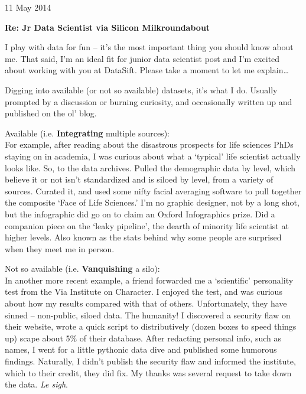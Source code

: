 \documentclass{../res}
\begin{document}
 
\begin{sloppypar}
 
%


\begin{resume} 
 
11 May 2014




\textbf{Re: Jr Data Scientist via Silicon Milkroundabout}

I play with data for fun -- it's the most important thing you should know about me. That said, I'm an ideal fit for junior data scientist post and I'm excited about working with you at DataSift. Please take a moment to let me explain\ldots

Digging into available (or not so available) datasets, it's what I do. Usually prompted by a discussion or burning curiosity, and occasionally written up and published on the ol' blog.

Available (i.e. \textbf{Integrating} multiple sources): \\
For example, after reading about the disastrous prospects for life sciences PhDs staying on in academia, I was curious about what a `typical' life scientist actually looks like. So, to the data archives. Pulled the demographic data by level, which believe it or not isn't standardized and is siloed by level, from a variety of sources. Curated it, and used some nifty facial averaging software to pull together the composite `Face of Life Sciences.' I'm no graphic designer, not by a long shot, but the infographic did go on to claim an Oxford Infographics prize. Did a companion piece on the `leaky pipeline', the dearth of minority life scientist at higher levels. Also known as the stats behind why some people are surprised when they meet me in person.

Not so available (i.e. \textbf{Vanquishing} a silo):\\
In another more recent example, a friend forwarded me a `scientific' personality test from the Via Institute on Character. I enjoyed the test, and was curious about how my results compared with that of others. Unfortunately, they have sinned -- non-public, siloed data. The humanity! I discovered a security flaw on their website, wrote a quick script to distributively (dozen boxes to speed things up) scape about 5\% of their database. After redacting personal info, such as names, I went for a little pythonic data dive and published some humorous findings. Naturally, I didn't publish the security flaw and informed the institute, which to their credit, they did fix. My thanks was several request to take down the data. \textit{Le sigh}.


\end{resume}
\end{sloppypar}
\end{document}
